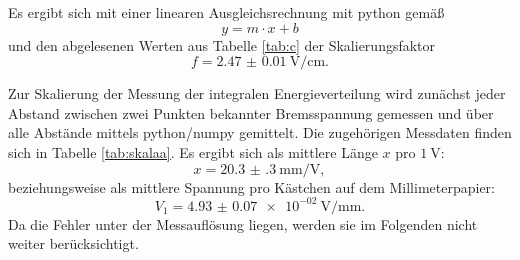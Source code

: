 Es ergibt sich mit einer linearen Ausgleichsrechnung mit python \cite{python} gemäß
\begin{equation*}
	y = m \cdot x + b
\end{equation*}
und den abgelesenen Werten aus Tabelle \ref{tab:c} der Skalierungsfaktor
\begin{equation*}
	f = \SI{2.47(1)}{\volt\per\centi\meter} \mathrm{.}
\end{equation*}

Zur Skalierung der Messung der integralen Energieverteilung wird zunächst jeder Abstand zwischen zwei Punkten bekannter Bremsspannung gemessen und über alle Abstände mittels python/numpy \cite{numpy} gemittelt.
Die zugehörigen Messdaten finden sich in Tabelle \ref{tab:skalaa}.
Es ergibt sich als mittlere Länge $x$ pro $\SI{1}{\volt}$:
\begin{equation}
	x=\SI{20.3(3)}{\milli\meter\per\volt} \mathrm{,}
\end{equation}
beziehungsweise als mittlere Spannung pro Kästchen auf dem Millimeterpapier:
\begin{equation}
	V_1= \SI{4.93(7)e-02}{\volt\per\milli\meter} \mathrm{.}
\end{equation}
Da die Fehler unter der Messauflösung liegen, werden sie im Folgenden nicht weiter berücksichtigt.

